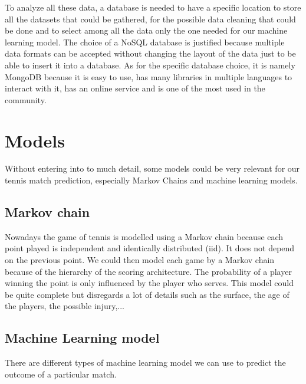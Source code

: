 \documentclass[12pt]{article}
\begin{document}
To analyze all these data, a database is needed to have a specific location to store all the datasets that could be gathered, for the possible data cleaning that could be done and to select among all the data only the one needed for our machine learning model. The choice of a NoSQL database is justified because multiple data formats can be accepted without changing the layout of the data just to be able to insert it into a database. As for the specific  database choice, it is namely MongoDB because it is easy to use, has many libraries in multiple languages to interact with it, has an online service and is one of the most used in the community. 

\section*{Models}

Without entering into to much detail, some models could be very relevant for our tennis match prediction, especially Markov Chains and machine learning models.

\subsection*{Markov chain}
Nowadays the game of tennis is modelled using a Markov chain because each point played is independent and identically distributed (iid). It does not depend on the previous point. We could then model each game by a Markov chain because of the hierarchy of the scoring architecture. The probability of a player winning the point is only influenced by the player who serves. This model could be quite complete but disregards a lot of details such as the surface, the age of the players, the possible injury,...

\subsection*{Machine Learning model}
There are different types of machine learning model we can use to predict the outcome of a particular match.
\end{document}
